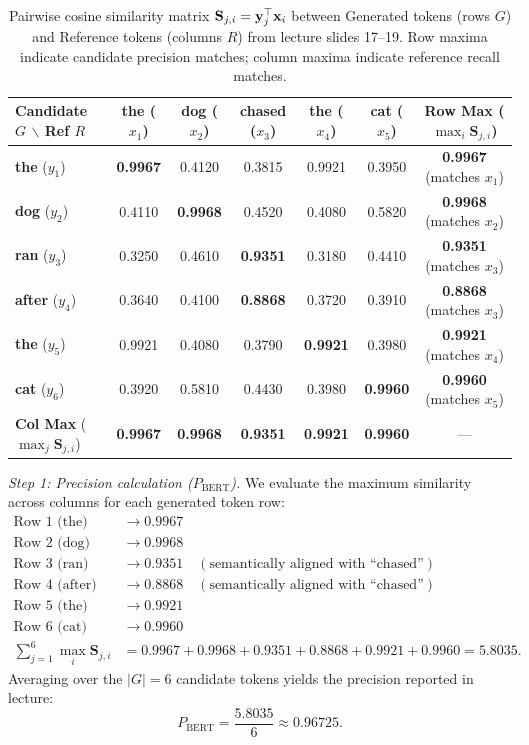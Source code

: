 \documentclass[../../main.tex]{subfiles}
\begin{document}
\begin{table}[htbp]
\centering
\small
\caption{Pairwise cosine similarity matrix $\mathbf{S}_{j, i} = \mathbf{y}_j^\top \mathbf{x}_i$ between Generated tokens (rows $G$) and Reference tokens (columns $R$) from lecture slides 17--19. Row maxima indicate candidate precision matches; column maxima indicate reference recall matches.}
\label{tab:bertscore_matrix_lecture}
\begin{tabular}{lccccc|c}
\toprule
\textbf{Candidate $G$ $\backslash$ Ref $R$} & \textbf{the} ($x_1$) & \textbf{dog} ($x_2$) & \textbf{chased} ($x_3$) & \textbf{the} ($x_4$) & \textbf{cat} ($x_5$) & \textbf{Row Max} ($\max_i \mathbf{S}_{j,i}$) \\
\midrule
\textbf{the} ($y_1$)   & \textbf{0.9967} & 0.4120 & 0.3815 & 0.9921 & 0.3950 & \textbf{0.9967} (matches $x_1$) \\
\textbf{dog} ($y_2$)   & 0.4110 & \textbf{0.9968} & 0.4520 & 0.4080 & 0.5820 & \textbf{0.9968} (matches $x_2$) \\
\textbf{ran} ($y_3$)   & 0.3250 & 0.4610 & \textbf{0.9351} & 0.3180 & 0.4410 & \textbf{0.9351} (matches $x_3$) \\
\textbf{after} ($y_4$) & 0.3640 & 0.4100 & \textbf{0.8868} & 0.3720 & 0.3910 & \textbf{0.8868} (matches $x_3$) \\
\textbf{the} ($y_5$)   & 0.9921 & 0.4080 & 0.3790 & \textbf{0.9921} & 0.3980 & \textbf{0.9921} (matches $x_4$) \\
\textbf{cat} ($y_6$)   & 0.3920 & 0.5810 & 0.4430 & 0.3980 & \textbf{0.9960} & \textbf{0.9960} (matches $x_5$) \\
\midrule
\textbf{Col Max} ($\max_j \mathbf{S}_{j,i}$) & \textbf{0.9967} & \textbf{0.9968} & \textbf{0.9351} & \textbf{0.9921} & \textbf{0.9960} & --- \\
\bottomrule
\end{tabular}
\end{table}

\textit{Step 1: Precision calculation ($P_{\text{BERT}}$).}
We evaluate the maximum similarity across columns for each generated token row:
\begin{align}
\text{Row 1 (the)}   &\to 0.9967 \nonumber \\
\text{Row 2 (dog)}   &\to 0.9968 \nonumber \\
\text{Row 3 (ran)}   &\to 0.9351 \quad (\text{semantically aligned with ``chased''}) \nonumber \\
\text{Row 4 (after)} &\to 0.8868 \quad (\text{semantically aligned with ``chased''}) \nonumber \\
\text{Row 5 (the)}   &\to 0.9921 \nonumber \\
\text{Row 6 (cat)}   &\to 0.9960 \nonumber \\
\sum_{j=1}^6 \max_i \mathbf{S}_{j, i} &= 0.9967 + 0.9968 + 0.9351 + 0.8868 + 0.9921 + 0.9960 = 5.8035.
\end{align}
Averaging over the $|G| = 6$ candidate tokens yields the precision reported in lecture:
\begin{equation}
P_{\text{BERT}} = \frac{5.8035}{6} \approx \mathbf{0.96725}.
\end{equation}
\end{document}
